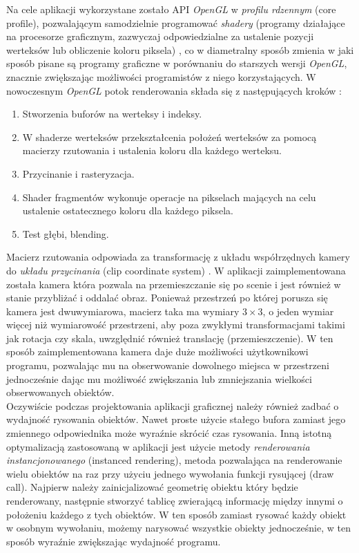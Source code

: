 \documentclass[12pt, letterpaper]{report}
\begin{document}
    Na cele aplikacji wykorzystane zostało API \emph{OpenGL} w \emph{profilu rdzennym} (core profile), 
    pozwalającym samodzielnie programować \emph{shadery} (programy działające na procesorze graficznym, 
    zazwyczaj odpowiedzialne za ustalenie pozycji werteksów lub obliczenie koloru piksela) \cite{grafika3d}, 
    co w diametralny sposób zmienia w jaki sposób pisane są programy graficzne w porównaniu 
    do starszych wersji \emph{OpenGL}, znacznie zwiększając możliwości programistów z niego 
    korzystających. W nowoczesnym \emph{OpenGL} potok renderowania składa 
    się z następujących kroków \cite{grafika3d}:
    \begin{enumerate}
        \item Stworzenia buforów na werteksy i indeksy.
        \item W shaderze werteksów przekształcenia położeń werteksów 
        za pomocą macierzy rzutowania i ustalenia koloru dla każdego werteksu.
        \item Przycinanie i rasteryzacja.
        \item Shader fragmentów wykonuje operacje na pikselach mających na celu 
        ustalenie ostatecznego koloru dla każdego piksela.
        \item Test głębi, blending.
    \end{enumerate}

    Macierz rzutowania odpowiada za transformację z układu współrzędnych kamery do \emph{układu przycinania}
    (clip coordinate system) \cite{grafika3d}. W aplikacji 
    zaimplementowana została kamera która pozwala na przemieszczanie się po scenie i jest również w stanie 
    przybliżać i oddalać obraz. 
    Ponieważ przestrzeń po której porusza się
    kamera jest dwuwymiarowa, macierz taka ma wymiary $3 \times 3$, o jeden wymiar więcej niż wymiarowość 
    przestrzeni, aby poza zwykłymi transformacjami takimi jak rotacja czy skala, uwzględnić również
    translację (przemieszczenie).
    W ten sposób zaimplementowana kamera daje duże możliwości użytkownikowi programu, pozwalając 
    mu na obserwowanie dowolnego miejsca w przestrzeni jednocześnie dając mu możliwość zwiększania
    lub zmniejszania wielkości obserwowanych obiektów. \\

    Oczywiście podczas projektowania aplikacji graficznej należy również zadbać o
    wydajność rysowania obiektów. Nawet proste użycie stałego bufora zamiast jego 
    zmiennego odpowiednika może wyraźnie skrócić czas rysowania.
    Inną istotną optymalizacją zastosowaną w aplikacji jest użycie 
    metody \emph{renderowania instancjonowanego} (instanced rendering), 
    metoda pozwalająca na renderowanie wielu obiektów na raz 
    przy użyciu jednego wywołania funkcji rysującej (draw call). 
    Najpierw należy zainicjalizować geometrię obiektu który będzie renderowany, 
    następnie stworzyć tablicę zwierającą informację 
    między innymi o położeniu każdego z tych obiektów. 
    W ten sposób zamiast rysować każdy obiekt w osobnym wywołaniu, 
    możemy narysować wszystkie obiekty jednocześnie, 
    w ten sposób wyraźnie zwiększając wydajność programu.
\end{document}
